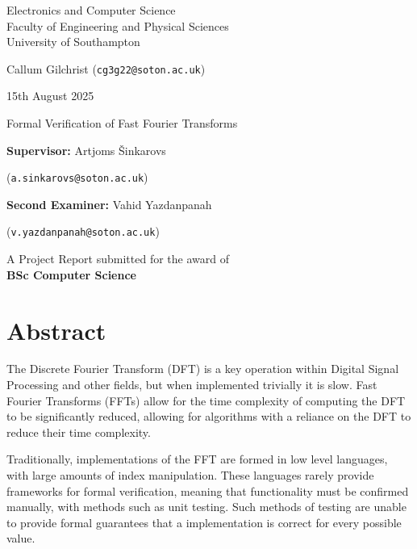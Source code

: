 \documentclass[12pt, twoside]{article}
\begin{document}
\thispagestyle{fancy}
\begin{center}
    \vspace*{20mm}
    \Large
    Electronics and Computer Science \\
    Faculty of Engineering and Physical Sciences \\
    University of Southampton 

    
    \vspace*{20mm}
    \Large Callum Gilchrist (\verb|cg3g22@soton.ac.uk|)
    
    \large 15th August 2025
    
    \vspace*{20mm}
    \Huge Formal Verification of Fast Fourier Transforms
    \vspace*{60mm}
    
    \large \textbf{Supervisor:} Artjoms Šinkarovs 

    (\verb|a.sinkarovs@soton.ac.uk|)

    \large \textbf{Second Examiner:} Vahid Yazdanpanah 

    (\verb|v.yazdanpanah@soton.ac.uk|)

    \vspace*{10mm}
    \normalsize A Project Report submitted for the award of \\
    \large \textbf{BSc Computer Science}
    
    \vspace*{10mm}
    
\end{center}
\clearpage
{}
\section*{Abstract}

The Discrete Fourier Transform (DFT) is a key operation within Digital Signal 
Processing and other fields, but when implemented trivially it is slow.
Fast Fourier Transforms (FFTs) allow for the time complexity of computing the 
DFT to be significantly reduced, allowing for algorithms with a reliance on the
DFT to reduce their time complexity.

Traditionally, implementations of the FFT are formed in low level 
languages, with large amounts of index manipulation. 
These languages rarely provide frameworks for formal verification, 
meaning that functionality must be confirmed manually, with methods such as unit
testing.
Such methods of testing are unable to provide formal guarantees that a 
implementation is correct for every possible value.
\end{document}
